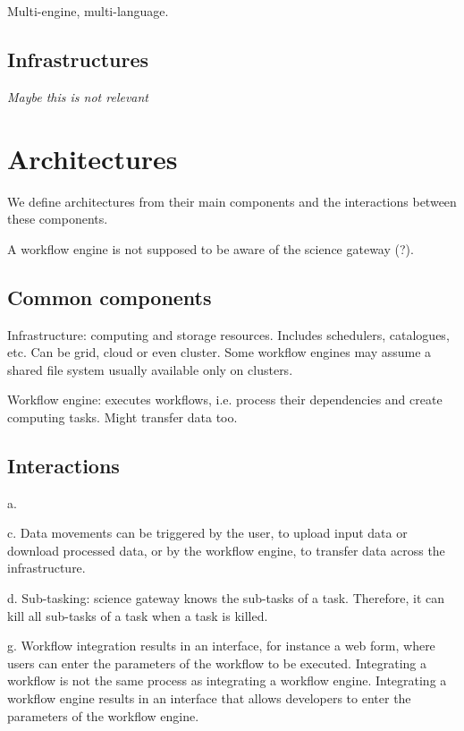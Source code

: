 \documentclass[preprint,3p,twocolumn]{elsarticle}
\newcommand{\todo}[1]{\color{blue}\xspace\emph{#1}\xspace\color{black}}
\begin{document}
Multi-engine, multi-language.


\subsection{Infrastructures}

\todo{Maybe this is not relevant}

\section{Architectures}

We define architectures from their main components and the interactions
between these components.

A workflow engine is not supposed to be aware of the science gateway (?).


\subsection{Common components}

Infrastructure: computing and storage resources. Includes
  schedulers, catalogues, etc. Can be grid, cloud or even
  cluster. Some workflow engines may assume a shared file system
  usually available only on clusters.

  Workflow engine: executes workflows, i.e. process their dependencies
  and create computing tasks. Might transfer data too.

\subsection{Interactions}

a. 

c. Data movements can be triggered by the user, to upload input data
or download processed data, or by the workflow engine, to transfer
data across the infrastructure. 

d. Sub-tasking: science gateway knows the sub-tasks of a
task. Therefore, it can kill all sub-tasks of a task when a task is killed.

g. Workflow integration results in an interface, for instance a web form,
where users can enter the parameters of the workflow to be
executed. Integrating a workflow is not the same process as
integrating a workflow engine. Integrating a workflow engine results
in an interface that allows developers to enter the parameters of the
workflow engine.
\end{document}
